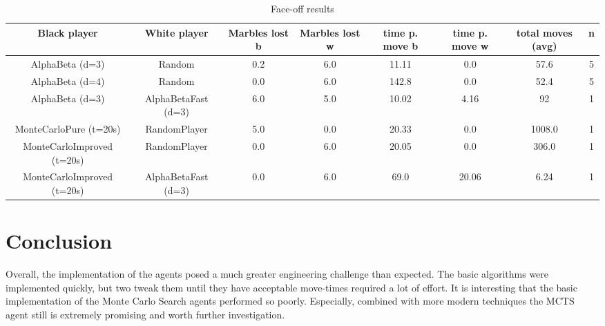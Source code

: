 \documentclass{llncs}
\begin{document}
\begin{table}
  \begin{adjustwidth}{-5in}{-5in}%
    \begin{center}
      \begin{tabular}{ | c | c | c | c | c | c | c | c | }
        \hline
        Black player               & White player        & \small{Marbles lost b} & \small{Marbles lost w} & \small{time p. move b} & \small{time p. move w} & \small{total moves (avg)} & n \\
        \hline
        AlphaBeta (d=3)            & Random              & 0.2                    & 6.0                    & 11.11                  & 0.0                    & 57.6                      & 5 \\
        \hline
        AlphaBeta (d=4)            & Random              & 0.0                    & 6.0                    & 142.8                  & 0.0                    & 52.4                      & 5 \\
        \hline
        AlphaBeta (d=3)            & AlphaBetaFast (d=3) & 6.0                    & 5.0                    & 10.02                  & 4.16                   & 92                        & 1 \\
        \hline
        MonteCarloPure (t=20s)     & RandomPlayer        & 5.0                    & 0.0                    & 20.33                  & 0.0                    & 1008.0                    & 1 \\
        \hline
        MonteCarloImproved (t=20s) & RandomPlayer        & 0.0                    & 6.0                    & 20.05                  & 0.0                    & 306.0                     & 1 \\
        \hline
        MonteCarloImproved (t=20s) & AlphaBetaFast (d=3) & 0.0                    & 6.0                    & 69.0                   & 20.06                  & 6.24                      & 1 \\
        \hline
      \end{tabular}
    \end{center}
    \label{node_count}
  \end{adjustwidth}
  \medskip%
  \caption{Face-off results}
\end{table}

\section{Conclusion}
Overall, the implementation of the agents posed a much greater engineering challenge than expected. The basic algorithms were implemented quickly, but two tweak them until they have acceptable move-times required a lot of effort. It is interesting that the basic implementation of the Monte Carlo Search agents performed so poorly. Especially, combined with more modern techniques the MCTS agent still is extremely promising and worth further investigation.




\end{document}
